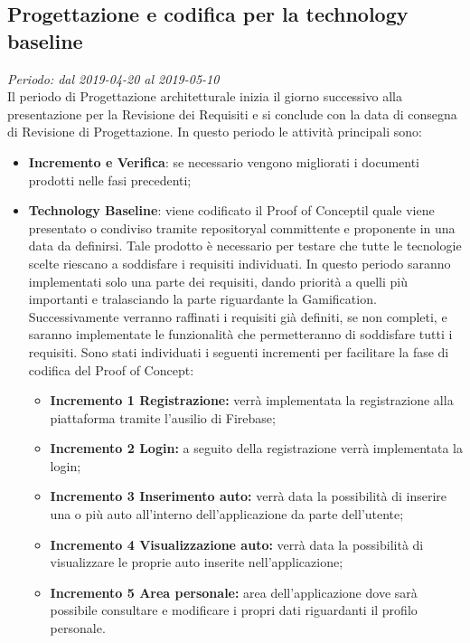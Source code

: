 \subsection{Progettazione e codifica per la technology baseline}
\textit{Periodo: dal 2019-04-20 al 2019-05-10} \\
Il periodo di Progettazione architetturale inizia il giorno successivo alla presentazione per la Revisione dei Requisiti e si conclude con la data di consegna di Revisione di 
Progettazione. In questo periodo le attività principali sono:
\begin{itemize}
	\item \textbf{Incremento e Verifica}: se necessario vengono migliorati i 
	documenti prodotti nelle fasi precedenti;
	\item \textbf{Technology Baseline\glo}: viene codificato il Proof of Concept\glosp il quale viene presentato o condiviso tramite repository\glosp al committente e proponente in una data da definirsi. Tale prodotto è necessario per testare che tutte le tecnologie scelte riescano a soddisfare i requisiti individuati. In questo periodo saranno implementati solo una parte dei requisiti, dando priorità a quelli più importanti e tralasciando la parte riguardante la Gamification\glo. Successivamente verranno raffinati i requisiti già definiti, se non completi, e saranno implementate le funzionalità che permetteranno di soddisfare tutti i requisiti.
	Sono stati individuati i seguenti incrementi per facilitare la fase di codifica del Proof of Concept\glo:
	\begin{itemize}
		\item \textbf{Incremento 1 Registrazione:} verrà implementata la registrazione alla piattaforma tramite l'ausilio di Firebase\glo;
		\item \textbf{Incremento 2 Login:} a seguito della registrazione verrà implementata la login;
		\item \textbf{Incremento 3 Inserimento auto:} verrà data la possibilità di inserire una o più auto all'interno dell'applicazione da parte dell'utente;
		\item \textbf{Incremento 4 Visualizzazione auto:} verrà data la possibilità di visualizzare le proprie auto inserite nell'applicazione;
		\item \textbf{Incremento 5 Area personale:} area dell'applicazione dove sarà possibile consultare e modificare i propri dati riguardanti il profilo personale.
		
		
	\end{itemize}
		
\end{itemize}

